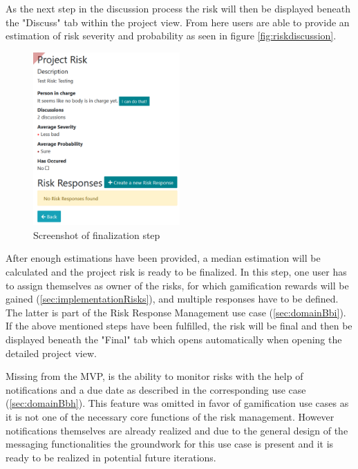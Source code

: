 As the next step in the discussion process the risk will then be displayed beneath the "Discuss" tab within the project view. From here users are able to provide an estimation of risk severity and probability as seen in figure \ref{fig:riskdiscussion}.

 \begin{figure}
	\includegraphics[width=0.5\textwidth]{Assets/implementation_shots/riskfinalization.png}
	\caption{Screenshot of finalization step}
	\label{fig:riskdfinalization}
\end{figure}

After enough estimations have been provided, a median estimation will be calculated and the project risk is ready to be finalized. In this step, one user has to assign themselves as owner of the risks, for which gamification rewards will be gained (\ref{sec:implementationRisks}), and multiple responses have to be defined. The latter is part of the Risk Response Management use case (\ref{sec:domainBbi}). If the above mentioned steps have been fulfilled, the risk will be final and then be displayed beneath the "Final" tab which opens automatically when opening the detailed project view.

 Missing from the MVP, is the ability to monitor risks with the help of notifications and a due date as described in the corresponding use case (\ref{sec:domainBbh}). This feature was omitted in favor of gamification use cases as it is not one of the necessary core functions of the risk management. However notifications themselves are already realized and due to the general design of the messaging functionalities the groundwork for this use case is present and it is ready to be realized in potential future iterations.

